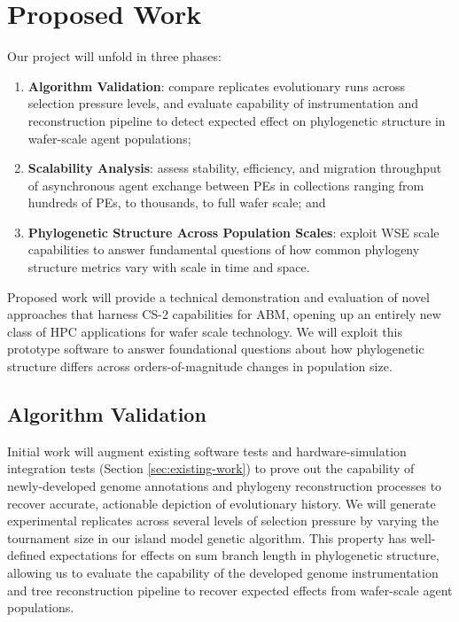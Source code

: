 \section{Proposed Work} \label{sec:objectives}

Our project will unfold in three phases:
\begin{enumerate}
\item \textbf{Algorithm Validation}: compare replicates evolutionary runs across selection pressure levels, and evaluate capability of instrumentation and reconstruction pipeline to detect expected effect on phylogenetic structure in wafer-scale agent populations;
\item \textbf{Scalability Analysis}: assess stability, efficiency, and migration throughput of asynchronous agent exchange between PEs in collections ranging from hundreds of PEs, to thousands, to full wafer scale; and
\item \textbf{Phylogenetic Structure Across Population Scales}: exploit WSE scale capabilities to answer fundamental questions of how common phylogeny structure metrics vary with scale in time and space.
\end{enumerate}

Proposed work will provide a technical demonstration and evaluation of novel approaches that harness CS-2 capabilities for ABM, opening up an entirely new class of HPC applications for wafer scale technology.
We will exploit this prototype software to answer foundational questions about how phylogenetic structure differs across orders-of-magnitude changes in population size.

\subsection{Algorithm Validation}

Initial work will augment existing software tests and hardware-simulation integration tests (Section \ref{sec:existing-work}) to prove out the capability of newly-developed genome annotations and phylogeny reconstruction processes to recover accurate, actionable depiction of evolutionary history.
We will generate experimental replicates across several levels of selection pressure by varying the tournament size in our island model genetic algorithm.
This property has well-defined expectations for effects on sum branch length in phylogenetic structure, allowing us to evaluate the capability of the developed genome instrumentation and tree reconstruction pipeline to recover expected effects from wafer-scale agent populations.


